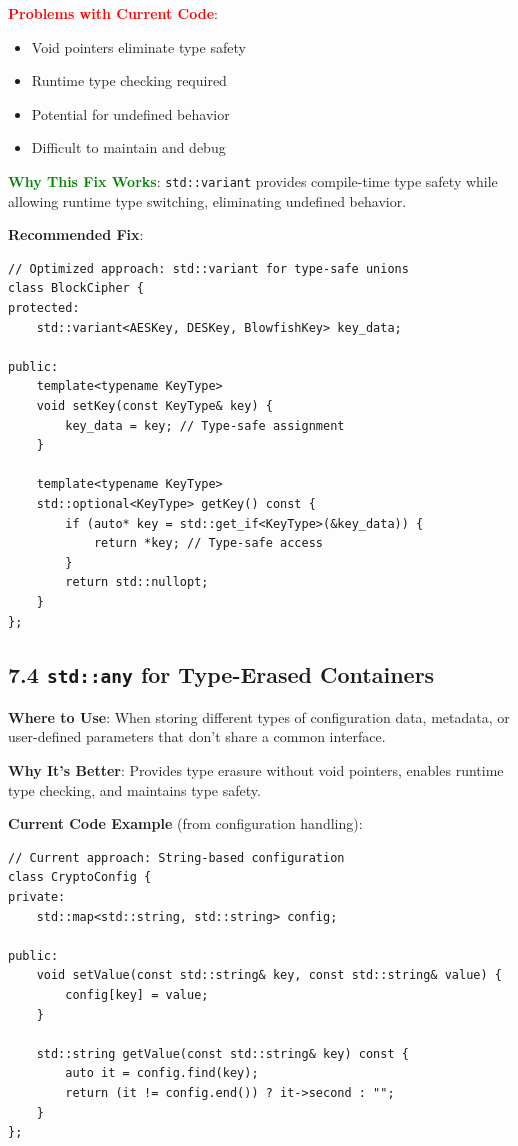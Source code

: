 \documentclass[11pt,a4paper]{article}
\begin{document}
\textcolor{red}{\textbf{Problems with Current Code}}:
\begin{itemize}
    \item Void pointers eliminate type safety
    \item Runtime type checking required
    \item Potential for undefined behavior
    \item Difficult to maintain and debug
\end{itemize}

\textcolor{green}{\textbf{Why This Fix Works}}: \texttt{std::variant} provides compile-time type safety while allowing runtime type switching, eliminating undefined behavior.

\textbf{Recommended Fix}:
\begin{lstlisting}
// Optimized approach: std::variant for type-safe unions
class BlockCipher {
protected:
    std::variant<AESKey, DESKey, BlowfishKey> key_data;
    
public:
    template<typename KeyType>
    void setKey(const KeyType& key) {
        key_data = key; // Type-safe assignment
    }
    
    template<typename KeyType>
    std::optional<KeyType> getKey() const {
        if (auto* key = std::get_if<KeyType>(&key_data)) {
            return *key; // Type-safe access
        }
        return std::nullopt;
    }
};
\end{lstlisting}

\subsection{7.4 \texttt{std::any} for Type-Erased Containers}

\textbf{Where to Use}: When storing different types of configuration data, metadata, or user-defined parameters that don't share a common interface.

\textbf{Why It's Better}: Provides type erasure without void pointers, enables runtime type checking, and maintains type safety.

\textbf{Current Code Example} (from configuration handling):
\begin{lstlisting}
// Current approach: String-based configuration
class CryptoConfig {
private:
    std::map<std::string, std::string> config;
    
public:
    void setValue(const std::string& key, const std::string& value) {
        config[key] = value;
    }
    
    std::string getValue(const std::string& key) const {
        auto it = config.find(key);
        return (it != config.end()) ? it->second : "";
    }
};
\end{lstlisting}
\end{document}
